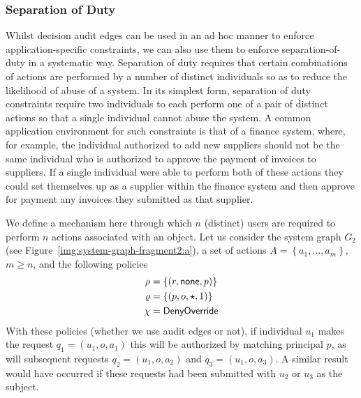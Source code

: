 \documentclass{article}
\newcommand{\set}[1]{\ensuremath{\left\{#1\right\}}} \newcommand{\setO}[1]{\ensuremath{\left\{#1\right.}} \newcommand{\setC}[1]{\ensuremath{\left.#1\right\}}} \newcommand{\setN}[1]{\ensuremath{\left.#1\right.}} \newcommand{\sett}[1]{\ensuremath{\left\{\textit{#1}\right\}}} \newcommand{\tuple}[1]{\ensuremath{\left(#1\right)}} \newcommand{\tuplet}[1]{\ensuremath{\left(\textit{#1}\right)}} \newcommand{\card}[1]{\left| #1 \right|}
\begin{document}
\subsubsection{Separation of Duty}\label{sec:extended_typed_edges:decision_audit_edges:separation_of_duty}
Whilst decision audit edges can be used in an ad hoc manner to enforce application-specific constraints, we can also use them to enforce separation-of-duty in a systematic way.
Separation of duty requires that certain combinations of actions are performed by a number of distinct individuals so as to reduce the likelihood of abuse of a system.
In its simplest form, separation of duty constraints require two individuals to each perform one of a pair of distinct actions so that a single individual cannot abuse the system.
A common application environment for such constraints is that of a finance system, where, for example, the individual authorized to add new suppliers should not be the same individual who is authorized to approve the payment of invoices to suppliers.
If a single individual were able to perform both of these actions they could set themselves up as a supplier within the finance system and then approve for payment any invoices they submitted as that supplier.

We define a mechanism here through which $n$ (distinct) users are required to perform $n$ actions associated with an object.
Let us consider the system graph $G_2$ (see Figure~\ref{img:system-graph-fragment2:a}), a set of actions $A = \set{a_1,\dots,a_m}$, $m \geqslant n$, and the following policies
\begin{align*}
    \rho &= \set{(r,\none,p)} \\
    \varrho &= \set{(p,o,\star,1)} \\
    \crs &= \crso{DenyOverride}
\end{align*}
With these policies (whether we use audit edges or not), if individual $u_1$ makes the request $q_1 = (u_1,o,a_1)$ this will be authorized by matching principal $p$, as will subsequent requests $q_2 = (u_1,o,a_2)$ and $q_3 = (u_1,o,a_3)$.
A similar result would have occurred if these requests had been submitted with $u_2$ or $u_3$ as the subject.
\end{document}
